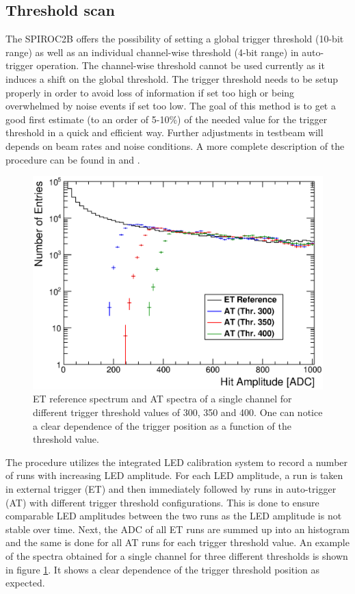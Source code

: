 \subsection{Threshold scan}

The SPIROC2B offers the possibility of setting a global trigger threshold (10-bit range) as well as an individual channel-wise threshold (4-bit range) in auto-trigger operation. The channel-wise threshold cannot be used currently as it induces a shift on the global threshold. The trigger threshold needs to be setup properly in order to avoid loss of information if set too high or being overwhelmed by noise events if set too low. The goal of this method is to get a good first estimate (to an order of 5-10\%) of the needed value for the trigger threshold in a quick and efficient way. Further adjustments in testbeam will depends on beam rates and noise conditions. A more complete description of the procedure can be found in \cite{Hartbrich:2016bbz} and \cite{LloydTrigger}.

\begin{figure}[htbp!]
  \centering
  \includegraphics[width=0.6\linewidth]{../Thesis_Plots/Commissioning/Plots/SpectraADC_HBU2_12.eps}
  \caption{ET reference spectrum and AT spectra of a single channel for different trigger threshold values of 300, 350 and 400. One can notice a clear dependence of the trigger position as a function of the threshold value.} \label{fig:ADCTriggerThreshold}
\end{figure}

The procedure utilizes the integrated LED calibration system to record a number of runs with increasing LED amplitude. For each LED amplitude, a run is taken in external trigger (ET) and then immediately followed by runs in auto-trigger (AT) with different trigger threshold configurations. This is done to ensure comparable LED amplitudes between the two runs as the LED amplitude is not stable over time. Next, the ADC of all ET runs are summed up into an histogram and the same is done for all AT runs for each trigger threshold value. An example of the spectra obtained for a single channel for three different thresholds is shown in figure \ref{fig:ADCTriggerThreshold}. It shows a clear dependence of the trigger threshold position as expected.

